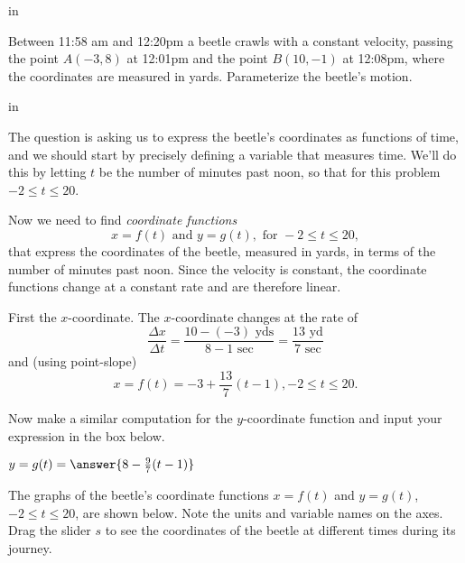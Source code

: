 \documentclass{ximera}
\newcommand{\pskip}{\vskip 0.1 in}
\begin{document}
\pskip

 Between 11:58 am and 12:20pm a beetle crawls with a constant velocity, passing the point $A(-3,8)$ at 12:01pm and the point $B(10,-1)$ at 12:08pm, where the coordinates are measured in yards. Parameterize the beetle's motion.

\pskip

 The question is asking us to express the beetle's coordinates as functions of time, and we should start by precisely defining a variable that measures time. We'll do this by letting $t$ be the number of minutes past noon, so that for this problem $-2 \leq t \leq 20$. 

Now we need to find \emph{coordinate functions}
\[
   x = f(t) \text{ and } y = g(t) , \text{ for } -2\leq t \leq 20 ,
\]
that express the coordinates of the beetle, measured in yards, in terms of the number of minutes past noon.  Since the velocity is constant, the coordinate functions change at a constant rate and are therefore linear.

First the $x$-coordinate. The $x$-coordinate changes at the rate of 
\[
    \frac{\Delta x}{\Delta t} = \frac{10-(-3) \text{ yds}}{8-1 \text{ sec}} = \frac{13 \text{ yd}}{7 \text{ sec}}
\]
and (using point-slope) 
\[
     x = f(t) = -3 + \frac{13}{7}(t-1) , -2\leq t \leq 20 .
\]

Now make a similar computation for the $y$-coordinate function and input your expression in the box below.

\begin{question}  
         $ y=g(t) =  \answer{8-\frac{9}{7}(t-1)}$  
    \end{question}

\begin{exploration}\label{exp:pc1}
The graphs of the beetle's coordinate functions $x=f(t)$ and $y=g(t)$, $-2\leq t \leq 20$, are shown below. Note the units and variable names on the axes. Drag the slider $s$ to see the coordinates of the beetle at different times during its journey.
 
 
\begin{onlineOnly}
    \begin{center}
\end{center}
\end{onlineOnly}
\end{exploration}
\end{document}
